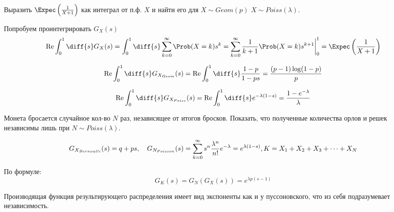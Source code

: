\begin{prb}
	\hspace{1cm}
	Выразить $\Expec\left(\frac{1}{X + 1}\right)$ как интеграл от п.ф. $X$ и найти его для $ X \sim Geom(p)$   $ X \sim Poiss(\lambda)$.
\end{prb}	

\begin{sol}
	Попробуем проинтегрировать $G_{X}(s)$	
	\begin{equation}
	\operatorname{Re} \int_{0}^{1} \diff{s} G_{X}(s)  = \int_{0}^{1} \diff{s}   \sum_{k=0}^{\infty} \Prob(X=k) s^{k} = \sum_{k=0}^{\infty} \frac{1}{k + 1}\Prob(X=k) s^{k + 1} \bigg|^{1}_{0} = \Expec\left(\frac{1}{X + 1}\right)
	\end{equation}

	\begin{equation}
	\operatorname{Re} \int_{0}^{1} \diff{s} G_{X_{Geom}}(s)  =  \operatorname{Re} \int_{0}^{1} \diff{s} \frac{1 - p}{1 - ps} = \frac{(p-1) \log (1-p)}{p}
	\end{equation}

	\begin{equation}
	\operatorname{Re}	\int_{0}^{1} \diff{s} G_{X_{Poiss}}(s)  =  \operatorname{Re} \int_{0}^{1} \diff{s} e^{-\lambda(1-s)} = \frac{1-e^{-\lambda }}{\lambda }
	\end{equation}


\end{sol}


\begin{prb}
	Монета бросается случайное кол-во $N$ раз, независящее от итогов бросков. Показать, что полученные количества орлов и решек независимы лишь при $N \sim Poiss(\lambda)$.
\end{prb}

\begin{sol}
	
	\begin{equation}
		G_{X_{Bernoulli}}(s) = q + ps, \quad G_{N_{Poisson}}(s) = \sum_{k=0}^{\infty} s^n \frac{\lambda^n}{n!} e^{-\lambda} = e^{\lambda(1-s)}, \\
		K = X_1 + X_2 + X_3 + \dots + X_N
	\end{equation}
	
	По формуле: 
	\begin{equation}
		G_K(s) = G_N(G_X(s)) = e^{\lambda p(s - 1)}
	\end{equation}

	Производящая функция результирующего распределения имеет вид экспоненты как и у пуссоновского, что из себя подразумевает независимость.
	
\end{sol}